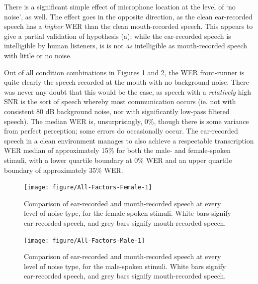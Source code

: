 There is a significant simple effect of microphone location at the level of `no noise', as well.  The effect goes in the opposite direction, as the clean ear-recorded speech has a \textit{higher} WER than the clean mouth-recorded speech.  This appears to give a partial validation of hypothesis (a); while the ear-recorded speech is intelligible by human listeners, is is not \textit{as} intelligible as mouth-recorded speech with little or no noise.

Out of all condition combinations in Figures \ref{fig:female-split} and \ref{fig:male-split}, the WER front-runner is quite clearly the speech recorded at the mouth with no background noise.  There was never any doubt that this would be the case, as speech with a \textit{relatively} high SNR is the sort of speech whereby most communication occurs (ie. not with consistent 80 dB background noise, nor with significantly low-pass filtered speech).  The median WER is, unsurprisingly, 0\%, though there is some variance from perfect perception; some errors do occasionally occur. The ear-recorded speech in a clean environment manages to also achieve a respectable transcription WER median of approximately 15\% for both the male- and female-spoken stimuli, with a lower quartile boundary at 0\% WER and an upper quartile boundary of approximately 35\% WER.


\begin{figure}[h!]

\texttt{[image: figure/All-Factors-Female-1]} 

\caption{Comparison of ear-recorded and mouth-recorded speech at every level of noise type, for the female-spoken stimuli.  White bars signify ear-recorded speech, and grey bars signify mouth-recorded speech.}\label{fig:female-split}
\end{figure}

\begin{figure}[h!]

\texttt{[image: figure/All-Factors-Male-1]} 

\caption{Comparison of ear-recorded and mouth-recorded speech at every level of noise type, for the male-spoken stimuli.  White bars signify ear-recorded speech, and grey bars signify mouth-recorded speech.}\label{fig:male-split}
\end{figure}



